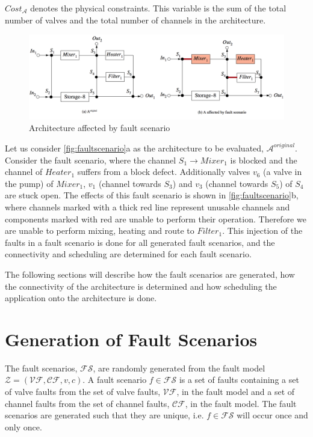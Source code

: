 $Cost_{\mathcal{A}}$ denotes the physical constraints. This variable is the sum of the total number of valves and the total number of channels in the architecture.

\begin{figure}
\centering
\includegraphics[width=\textwidth]{figures/faultscenario.png}
\caption[Architecture affected by fault scenario]{Architecture affected by fault scenario}
\label{fig:faultscenario}
\end{figure}

Let us consider \autoref{fig:faultscenario}a as the architecture to be evaluated, $\mathcal{A}^{original}$. Consider the fault scenario, where the channel $S_1 \rightarrow Mixer_1$ is blocked and the channel of $Heater_1$ suffers from a block defect. Additionally valves $v_6$ (a valve in the pump) of $Mixer_1$, $v_1$ (channel towards $S_3$) and $v_3$ (channel towards $S_5$) of $S_4$ are stuck open. The effects of this fault scenario is shown in \autoref{fig:faultscenario}b, where channels marked with a thick red line represent unusable channels and components marked with red are unable to perform their operation. Therefore we are unable to perform mixing, heating and route to $Filter_1$. This injection of the faults in a fault scenario is done for all generated fault scenarios, and the connectivity and scheduling are determined for each fault scenario.

The following sections will describe how the fault scenarios are generated, how the connectivity of the architecture is determined and how scheduling the application onto the architecture is done.

\section{Generation of Fault Scenarios}
\label{sec:fs-gen}
The fault scenarios, $\mathcal{FS}$, are randomly generated from the fault model $\mathcal{Z} = (\mathcal{VF}, \mathcal{CF}, v, c)$. A fault scenario $f \in \mathcal{FS}$ is a set of faults containing a set of valve faults from the set of valve faults, $\mathcal{VF}$, in the fault model and a set of channel faults from the set of channel faults, $\mathcal{CF}$, in the fault model. The fault scenarios are generated such that they are unique, i.e. $f \in \mathcal{FS}$ will occur once and only once.


